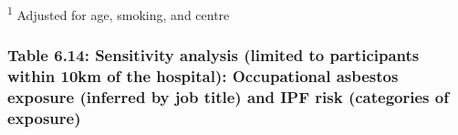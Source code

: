 \textsuperscript{1} Adjusted for age, smoking, and centre

\hypertarget{table-6.14-sensitivity-analysis-limited-to-participants-within-10km-of-the-hospital-occupational-asbestos-exposure-inferred-by-job-title-and-ipf-risk-categories-of-exposure}{%
\subsubsection{Table 6.14: Sensitivity analysis (limited to participants
within 10km of the hospital): Occupational asbestos exposure (inferred
by job title) and IPF risk (categories of
exposure)}\label{table-6.14-sensitivity-analysis-limited-to-participants-within-10km-of-the-hospital-occupational-asbestos-exposure-inferred-by-job-title-and-ipf-risk-categories-of-exposure}}

